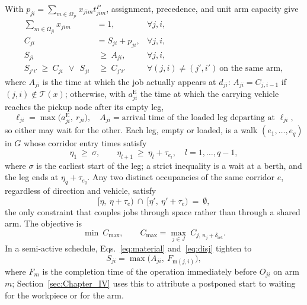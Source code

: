 \documentclass[preprint,review,12pt,authoryear]{elsarticle}
\begin{document}
With $p_{ji}=\sum_{m\in\Omega_{ji}}x_{jim}t^P_{jim}$, assignment, precedence, and unit arm capacity give
\begin{align}
\sum_{m\in\Omega_{ji}} x_{jim} &= 1, & \forall j,i,
\label{eq:assign}\\
C_{ji} &= S_{ji}+p_{ji}, & \forall j,i,
\label{eq:dur}\\
S_{ji} &\ \ge\ A_{ji}, & \forall j,i,
\label{eq:material}\\
S_{j'i'}\ \ge\ C_{ji}\ \ \vee\ \ S_{ji} &\ \ge\ C_{j'i'}
& \forall (j,i)\neq(j',i')\ \text{on the same arm},
\label{eq:disj}
\end{align}
where $A_{ji}$ is the time at which the job actually appears at $d_{ji}$: $A_{ji}=C_{j,i-1}$ if $(j,i)\notin\mathcal{T}(x)$; otherwise, with $a^{\mathrm{E}}_{ji}$ the time at which the carrying vehicle reaches the pickup node after its empty leg,
\begin{equation}
\label{eq:load}
\ell_{ji}=\max\bigl(a^{\mathrm{E}}_{ji},\ r_{ji}\bigr),
\quad
A_{ji}=\text{arrival time of the loaded leg departing at } \ell_{ji},
\end{equation}
so either may wait for the other.
Each leg, empty or loaded, is a walk $(e_1,\dots,e_q)$ in $G$ whose corridor entry times satisfy
\begin{equation}
\label{eq:walk}
\eta_1 \ \ge\ \sigma, \qquad
\eta_{l+1}\ \ge\ \eta_l+\tau_{e_l}, \quad l=1,\dots,q-1,
\end{equation}
where $\sigma$ is the earliest start of the leg; a strict inequality is a wait at a berth, and the leg ends at $\eta_q+\tau_{e_q}$.
Any two distinct occupancies of the same corridor $e$, regardless of direction and vehicle, satisfy
\begin{equation}
\label{eq:excl}
\bigl[\eta,\ \eta+\tau_e\bigr)\ \cap\
\bigl[\eta',\ \eta'+\tau_e\bigr)\ =\ \emptyset ,
\end{equation}
the only constraint that couples jobs through space rather than through a shared arm. The objective is
\begin{equation}
\label{eq:obj}
\min\ C_{\max},\qquad
C_{\max}=\max_{j\in J}\ C_{j,\,n_j+\delta_{\mathrm{ret}}} .
\end{equation}
In a semi-active schedule, Eqs.~\eqref{eq:material} and~\eqref{eq:disj} tighten to
\begin{equation}
\label{eq:bind}
S_{ji}=\max\bigl(A_{ji},\ F_{\mathrm{m}(j,i)}\bigr),
\end{equation}
where $F_m$ is the completion time of the operation immediately before $O_{ji}$ on arm $m$; Section~\ref{sec:Chapter_IV} uses this to attribute a postponed start to waiting for the workpiece or for the arm.
\end{document}
